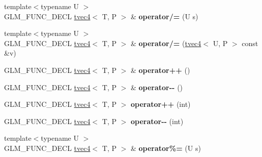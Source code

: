 \begin{DoxyCompactItemize}
\item 
\hypertarget{structglm_1_1detail_1_1tvec4_a6228f03a4111e2d08f76f1707bfedc7f}{{\footnotesize template$<$typename U $>$ }\\G\-L\-M\-\_\-\-F\-U\-N\-C\-\_\-\-D\-E\-C\-L \hyperlink{structglm_1_1detail_1_1tvec4}{tvec4}$<$ T, P $>$ \& {\bfseries operator/=} (U s)}\label{structglm_1_1detail_1_1tvec4_a6228f03a4111e2d08f76f1707bfedc7f}

\item 
\hypertarget{structglm_1_1detail_1_1tvec4_a2a1dd4b855a28388c59c44cc72c932c7}{{\footnotesize template$<$typename U $>$ }\\G\-L\-M\-\_\-\-F\-U\-N\-C\-\_\-\-D\-E\-C\-L \hyperlink{structglm_1_1detail_1_1tvec4}{tvec4}$<$ T, P $>$ \& {\bfseries operator/=} (\hyperlink{structglm_1_1detail_1_1tvec4}{tvec4}$<$ U, P $>$ const \&v)}\label{structglm_1_1detail_1_1tvec4_a2a1dd4b855a28388c59c44cc72c932c7}

\item 
\hypertarget{structglm_1_1detail_1_1tvec4_aaa93930bcde2580185a474e508508ed2}{G\-L\-M\-\_\-\-F\-U\-N\-C\-\_\-\-D\-E\-C\-L \hyperlink{structglm_1_1detail_1_1tvec4}{tvec4}$<$ T, P $>$ \& {\bfseries operator++} ()}\label{structglm_1_1detail_1_1tvec4_aaa93930bcde2580185a474e508508ed2}

\item 
\hypertarget{structglm_1_1detail_1_1tvec4_a207d975fb868347e3b1e320c71e8beeb}{G\-L\-M\-\_\-\-F\-U\-N\-C\-\_\-\-D\-E\-C\-L \hyperlink{structglm_1_1detail_1_1tvec4}{tvec4}$<$ T, P $>$ \& {\bfseries operator-\/-\/} ()}\label{structglm_1_1detail_1_1tvec4_a207d975fb868347e3b1e320c71e8beeb}

\item 
\hypertarget{structglm_1_1detail_1_1tvec4_a60d572f73f76dbdedd6b1a164f8aacaa}{G\-L\-M\-\_\-\-F\-U\-N\-C\-\_\-\-D\-E\-C\-L \hyperlink{structglm_1_1detail_1_1tvec4}{tvec4}$<$ T, P $>$ {\bfseries operator++} (int)}\label{structglm_1_1detail_1_1tvec4_a60d572f73f76dbdedd6b1a164f8aacaa}

\item 
\hypertarget{structglm_1_1detail_1_1tvec4_a880ec39f85acc9bbac0fe842670bec57}{G\-L\-M\-\_\-\-F\-U\-N\-C\-\_\-\-D\-E\-C\-L \hyperlink{structglm_1_1detail_1_1tvec4}{tvec4}$<$ T, P $>$ {\bfseries operator-\/-\/} (int)}\label{structglm_1_1detail_1_1tvec4_a880ec39f85acc9bbac0fe842670bec57}

\item 
\hypertarget{structglm_1_1detail_1_1tvec4_acaef893b94a3beafa931256d381efb42}{{\footnotesize template$<$typename U $>$ }\\G\-L\-M\-\_\-\-F\-U\-N\-C\-\_\-\-D\-E\-C\-L \hyperlink{structglm_1_1detail_1_1tvec4}{tvec4}$<$ T, P $>$ \& {\bfseries operator\%=} (U s)}\label{structglm_1_1detail_1_1tvec4_acaef893b94a3beafa931256d381efb42}


\end{DoxyCompactItemize}
